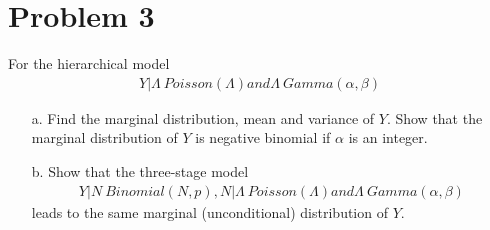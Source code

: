 \documentclass{article}
\begin{document}
\section*{Problem 3}
For the hierarchical model
\begin{align*}
Y|\Lambda ~ Poisson(\Lambda) and \Lambda ~ Gamma(\alpha, \beta)
\end{align*}
\begin{enumerate}
\item[a.]
Find the marginal distribution, mean and variance of $Y$. Show that the marginal distribution
of $Y$ is negative binomial if $\alpha$ is an integer.
\item[b.]
Show that the three-stage model
\begin{align*}
Y|N ~ Binomial(N,p), N|\Lambda~Poisson(\Lambda) and \Lambda ~ Gamma(\alpha, \beta)
\end{align*}
leads to the same marginal (unconditional) distribution of $Y$.
\end{enumerate}
\end{document}
